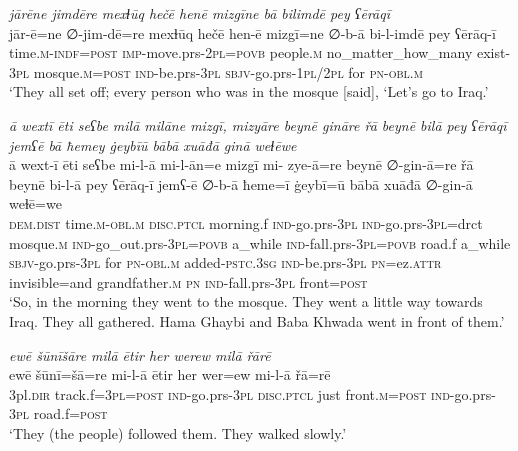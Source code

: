 \ea \label{BP.87}
\textit{jārēne jimdēre mexɫūq hečē henē mizgīne bā bilimdē pey ʕērāqī} \\ 
\gll jār-ē=ne ∅-jim-dē=re mexɫūq hečē hen-ē mizgī=ne ∅-b-ā bi-l-imdē pey ʕērāq-ī \\ 
 time\textsc{.m}\textsc{-indf}\textsc{=\textsc{post}} \textsc{imp-}move.prs-\textsc{2pl}\textsc{=\textsc{povb}} people\textsc{.m} no\_matter\_how\_many exist\textsc{-3pl} mosque\textsc{.m}\textsc{=\textsc{post}} \textsc{ind-}be.prs\textsc{-3pl} \textsc{sbjv-}go.prs\textsc{-\textsc{1pl}}/\textsc{2pl} for \textsc{pn}\textsc{-obl}\textsc{.m} \\ 
\glt `They all set off; every person who was in the mosque [said], ‘Let’s go to Iraq.'
\z 
 
\ea \label{BP.98}
\textit{ā wextī ēti seʕbe milā milāne mizgī, mizyāre beynē gināre řā beynē bilā pey ʕērāqī jemʕē bā ħemey ġeybīū bābā xuāđā ginā weɫēwe} \\ 
\gll ā wext-ī ēti seʕbe mi-l-ā mi-l-ān=e mizgī mi- zye-ā=re beynē ∅-gin-ā=re řā beynē bi-l-ā pey ʕērāq-ī jemʕ-ē ∅-b-ā ħeme=ī ġeybī=ū bābā xuāđā ∅-gin-ā weɫē=we \\ 
 \textsc{dem.dist} time\textsc{.m}\textsc{-obl}\textsc{.m} \textsc{disc.ptcl} morning.f \textsc{ind-}go.prs\textsc{-3pl} \textsc{ind-}go.prs\textsc{-3pl}=drct mosque\textsc{.m} \textsc{ind-}go\_out.prs\textsc{-3pl}\textsc{=\textsc{povb}} a\_while \textsc{ind-}fall.prs\textsc{-3pl}\textsc{=\textsc{povb}} road.f a\_while \textsc{sbjv-}go.prs\textsc{-3pl} for \textsc{pn}\textsc{-obl}\textsc{.m} added\textsc{-pstc}\textsc{.3sg} \textsc{ind-}be.prs\textsc{-3pl} \textsc{pn}=ez.\textsc{attr} invisible=and grandfather\textsc{.m} \textsc{pn} \textsc{ind-}fall.prs\textsc{-3pl} front\textsc{=\textsc{post}} \\ 
\glt `So, in the morning they went to the mosque. They went a little way towards Iraq. They all gathered. Hama Ghaybi and Baba Khwada went in front of them.'
\z 
 
\ea \label{BP.99}
\textit{ewē šūnīšāre milā ētir her werew milā řārē} \\ 
\gll ewē šūnī=šā=re mi-l-ā ētir her wer=ew mi-l-ā řā=rē \\ 
 3pl\textsc{.dir} track.f\textsc{=3pl}\textsc{=\textsc{post}} \textsc{ind-}go.prs\textsc{-3pl} \textsc{disc.ptcl} just front\textsc{.m}\textsc{=\textsc{post}} \textsc{ind-}go.prs\textsc{-3pl} road.f\textsc{=\textsc{post}} \\ 
\glt `They (the people) followed them. They walked slowly.'
\z 
 

